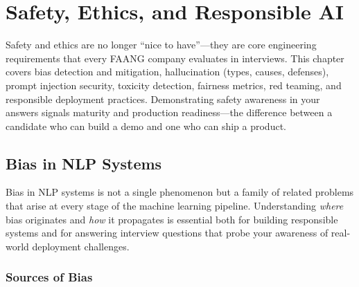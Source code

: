 
\chapter{Safety, Ethics, and Responsible AI}
\label{chap:safety_ethics}

\begin{tldr}
Safety and ethics are no longer ``nice to have''---they are core engineering
requirements that every FAANG company evaluates in interviews.  This chapter
covers bias detection and mitigation, hallucination (types, causes, defenses),
prompt injection security, toxicity detection, fairness metrics, red teaming,
and responsible deployment practices.  Demonstrating safety awareness in your
answers signals maturity and production readiness---the difference between a
candidate who can build a demo and one who can ship a product.
\end{tldr}

\bigskip

\section{Bias in NLP Systems}
\label{sec:bias_nlp}

Bias in NLP systems is not a single phenomenon but a family of related problems
that arise at every stage of the machine learning pipeline.  Understanding
\emph{where} bias originates and \emph{how} it propagates is essential both for
building responsible systems and for answering interview questions that probe
your awareness of real-world deployment challenges.

\subsection{Sources of Bias}

